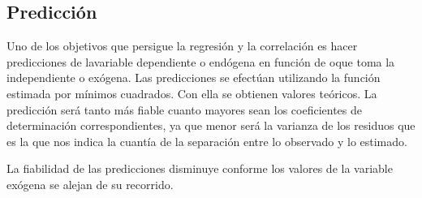 \documentclass{article}
\theoremstyle{definition}
\begin{document}
\subsection{Predicción}

Uno de los objetivos que persigue la regresión y la correlación es hacer
predicciones de lavariable dependiente o endógena en función de oque toma la
independiente o exógena. Las predicciones se efectúan utilizando la función
estimada por mínimos cuadrados. Con ella se obtienen valores teóricos. La
predicción será tanto más fiable cuanto mayores sean los coeficientes de
determinación correspondientes, ya que menor será la varianza de los residuos
que es la que nos indica la cuantía de la separación entre lo observado y lo
estimado.

La fiabilidad de las predicciones disminuye conforme los valores de la variable
exógena se alejan de su recorrido.
\end{document}
